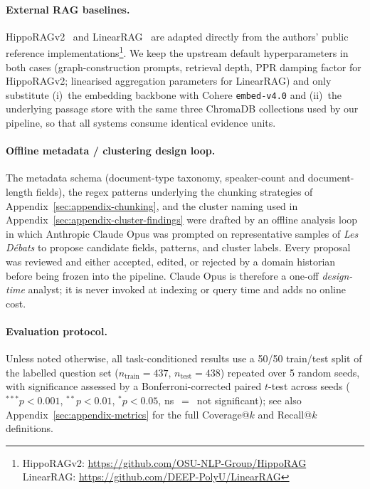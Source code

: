 \paragraph{External RAG baselines.}
HippoRAGv2~\cite{hipporagv2} and LinearRAG~\cite{linearrag_2025} are
adapted directly from the authors' public
reference implementations\footnote{HippoRAGv2:
\url{https://github.com/OSU-NLP-Group/HippoRAG}\\LinearRAG:
\url{https://github.com/DEEP-PolyU/LinearRAG}}. We keep the upstream
default hyperparameters in both cases (graph-construction prompts,
retrieval depth, PPR damping factor for HippoRAGv2; linearised aggregation
parameters for LinearRAG) and only substitute (i)~the embedding backbone
with Cohere \texttt{embed-v4.0} and (ii)~the underlying passage store
with the same three ChromaDB collections used by our pipeline, so that
all systems consume identical evidence units.

\paragraph{Offline metadata / clustering design loop.}
The metadata schema (document-type taxonomy, speaker-count and
document-length fields), the regex patterns underlying the chunking
strategies of Appendix~\ref{sec:appendix-chunking}, and the cluster
naming used in Appendix~\ref{sec:appendix-cluster-findings} were drafted
by an offline analysis loop in which Anthropic Claude Opus was prompted
on representative samples of \textit{Les D\'ebats} to propose candidate
fields, patterns, and cluster labels. Every proposal was reviewed and
either accepted, edited, or rejected by a domain historian before being
frozen into the pipeline. Claude Opus is therefore a one-off
\emph{design-time} analyst; it is never invoked at indexing or query
time and adds no online cost.

\paragraph{Evaluation protocol.}
Unless noted otherwise, all task-conditioned results use a 50/50
train/test split of the labelled question set
($n_{\text{train}}{=}437$, $n_{\text{test}}{=}438$) repeated over 5
random seeds, with significance assessed by a Bonferroni-corrected
paired $t$-test across seeds ($^{***}p{<}0.001$, $^{**}p{<}0.01$,
$^{*}p{<}0.05$, ns~$=$~not significant); see also
Appendix~\ref{sec:appendix-metrics} for the full Coverage@$k$ and
Recall@$k$ definitions.

